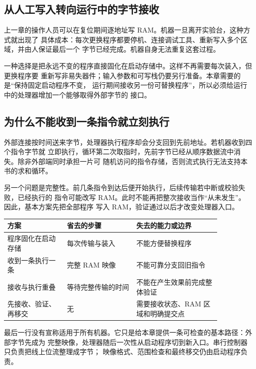 \subsection{从人工写入转向运行中的字节接收}

上一章的操作人员可以在复位期间逐地址写 RAM。机器一旦离开实验台，这种方式就出现了
具体成本：每次更换程序都要停机、连接调试工具、重新写入多个区域，并由人保证最后一个
字节已经完成。机器自身无法重复这套过程。

一种选择是把永远不变的程序直接固化在启动存储中。这样不再需要每次装入，但更换程序要
重新写非易失器件；输入参数和可写栈仍要另行准备。本章需要的是“保持固定启动程序不变，
运行期间接收另一份可替换程序”，所以必须给运行中的处理器增加一个能够取得外部字节的
接口。

\subsection{为什么不能收到一条指令就立刻执行}

外部连接按时间送来字节，处理器执行程序却会分支回到先前地址。若机器收到四个指令字节就
立即执行，循环第二次取指时，先前字节已经从顺序数据流中消失。除非外部端同时承担一片可
随机访问的指令存储，否则流式执行无法支持本书的求和循环。

另一个问题是完整性。前几条指令到达后便开始执行，后续传输若中断或校验失败，已经执行的
指令可能改写 RAM。此时不能再把整次接收当作“从未发生”。因此，基本方案先把全部程序
写入 RAM，验证通过以后才改变处理器入口。

\begin{longtable}{|L{0.24\linewidth}|L{0.28\linewidth}|L{0.34\linewidth}|}
\hline
{}
方案 & 省去的步骤 & 失去的能力或边界 \\ \hline
程序固化在启动存储 & 每次传输与装入 & 不能方便替换程序 \\ \hline
收到一条执行一条 & 完整 RAM 映像 & 不能可靠分支回旧指令 \\ \hline
接收与执行重叠 & 等待完整传输的时间 & 不能在产生效果前完成整体验证 \\ \hline
先接收、验证、再移交 & 无 & 需要接收状态、RAM 区域和明确提交点 \\ \hline
\end{longtable}

最后一行没有宣称适用于所有机器。它只是给本章提供一条可检查的基本路径：外部字节先成为
完整映像，处理器随后一次性从启动程序切到新入口。串行控制器只负责把线上位流整理成字节；
映像格式、范围检查和最终移交仍由启动程序负责。
